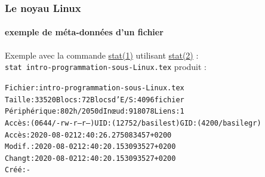 \documentclass[xcolor=svgnames,final,smaller,a4]{beamer}
\begin{document}
\begin{frame}
  \frametitle{Le noyau Linux}
  \framesubtitle{exemple de méta-données d'un fichier}
  
        Exemple avec la commande
        \href{https://man7.org/linux/man-pages/man2/stat.1.html}{stat(1)}
        utilisant
        \href{https://man7.org/linux/man-pages/man2/stat.2.html}{stat(2)}
        : \\ \texttt{stat intro-programmation-sous-Linux.tex} produit
        :

        \begin{relsize}{-0.5}
        \begin{alltt}
          Fichier : intro-programmation-sous-Linux.tex\\
         Taille : 33520     	Blocs : 72         Blocs d'E/S : 4096   fichier \\
      Périphérique: 802h/2050d	Inœud: 918078      Liens: 1\\
      Accès: (0644/-rw-r--r--)  UID: (12752/basilest)   GID: ( 4200/basilegr)\\
      Accès: 2020-08-02 12:40:26.275083457 +0200\\
      Modif.: 2020-08-02 12:40:20.153093527 +0200\\
      Changt: 2020-08-02 12:40:20.153093527 +0200\\
        Créé: -
        \end{alltt}
        \end{relsize}
\end{frame}
\end{document}
